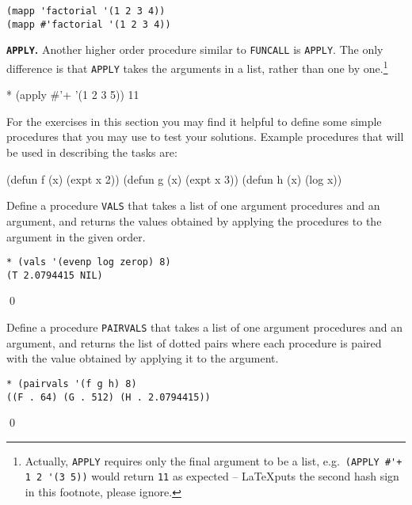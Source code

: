 \documentclass[a4paper,11pt]{article}
\begin{document}
\begin{uenum}
\begin{uenumi}
\begin{ucodeframe}
\begin{Verbatim}
(mapp 'factorial '(1 2 3 4))
(mapp #'factorial '(1 2 3 4))
\end{Verbatim}
\end{ucodeframe}

\item {\bf \Verb+APPLY+.} Another higher order procedure similar to \Verb+FUNCALL+ is \Verb+APPLY+. The only difference is that \Verb+APPLY+ takes the arguments in a list, rather than one by one.\footnote{Actually, \Verb+APPLY+ requires only the final argument to be a list, e.g.\ \Verb=(APPLY #'+ 1 2 '(3 5))= would return \Verb+11+ as expected -- \LaTeX puts the second hash sign in this footnote, please ignore.}


\begin{lispcode}
* (apply #'+ '(1 2 3 5))
11
\end{lispcode}
\end{uenumi}
\end{uenum}

\noindent\hrulefill

\noindent For the exercises in this section you may find it helpful to define some simple procedures that you may use to test your solutions. Example procedures that will be used in describing the tasks are:

\begin{lispcode}
(defun f (x) (expt x 2))
(defun g (x) (expt x 3))
(defun h (x) (log x))
\end{lispcode}


\begin{uexercise}
Define a procedure \Verb+VALS+ that takes a list of one argument procedures and an argument, and returns the values obtained by applying the procedures to the argument in the given order. 

\begin{ucodeframe}
\begin{Verbatim}
* (vals '(evenp log zerop) 8)
(T 2.0794415 NIL)
\end{Verbatim}
\end{ucodeframe}

\qed
\end{uexercise}

\begin{uexercise}
Define a procedure \Verb+PAIRVALS+ that takes a list of one argument procedures and an argument, and returns the list of dotted pairs where each procedure is paired with the value obtained by applying it to the argument. 

\begin{ucodeframe}
\begin{Verbatim}
* (pairvals '(f g h) 8)
((F . 64) (G . 512) (H . 2.0794415))
\end{Verbatim}
\end{ucodeframe}

\qed
\end{uexercise}
\end{document}
